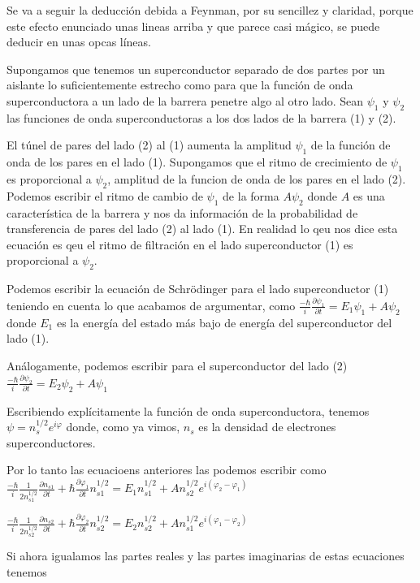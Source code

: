 Se va a seguir la deducción debida a Feynman, por su sencillez y claridad, porque este efecto enunciado unas lineas arriba y que parece casi mágico, se puede deducir en unas opcas líneas.

Supongamos que tenemos un superconductor separado de dos partes por un aislante lo suficientemente estrecho como para que la función de onda superconductora a un lado de la barrera penetre algo al otro lado. Sean $\psi_1$ y $\psi_2$ las funciones de onda superconductoras a los dos lados de la barrera (1) y (2).

El túnel de pares del lado (2) al (1) aumenta la amplitud $\psi_1$ de la función de onda de los pares en el lado (1). Supongamos que el ritmo de crecimiento de $\psi_1$ es proporcional a $\psi_2$, amplitud de la funcion de onda de los pares en el lado (2). Podemos escribir el ritmo de cambio de $\psi_1$ de la forma $A \psi_2$ donde $A$ es una característica de la barrera y nos da información de la probabilidad de transferencia de pares del lado (2) al lado (1). En realidad lo qeu nos dice esta ecuación es qeu el ritmo de filtración en el lado superconductor (1) es proporcional a $\psi_2$.

Podemos escribir la ecuación de Schrödinger para el lado superconductor (1) teniendo en cuenta lo que acabamos de argumentar, como $\frac{-\hbar}{i} \frac{\partial \psi_1}{\partial t} = E_1 \psi_1 + A \psi_2$ donde $E_1$ es la energía del estado más bajo de energía del superconductor del lado (1).

Análogamente, podemos escribir para el superconductor del lado (2) $\frac{-\hbar}{i} \frac{\partial \psi_2}{\partial t} = E_2 \psi_2 + A \psi_1$

Escribiendo explícitamente la función de onda superconductora, tenemos $\psi = n_s^{1/2} e^{i \varphi}$ donde, como ya vimos, $n_s$ es la densidad de electrones superconductores.

Por lo tanto las ecuacioens anteriores las podemos escribir como $\frac{-\hbar}{i} \frac{1}{2 n_{s1}^{1/2}} \frac{\partial n_{s1}}{\partial t} + \hbar \frac{\partial \varphi_1}{\partial t} n_{s1}^{1/2} = E_1 n_{s1}^{1/2} + A n_{s2}^{1/2} e^{i (\varphi_2 - \varphi_1)}$

$\frac{-\hbar}{i} \frac{1}{2 n_{s2}^{1/2}} \frac{\partial n_{s2}}{\partial t} + \hbar \frac{\partial \varphi_2}{\partial t} n_{s2}^{1/2} = E_2 n_{s2}^{1/2} + A n_{s1}^{1/2} e^{i (\varphi_1 - \varphi_2)}$

Si ahora igualamos las partes reales y las partes imaginarias de estas ecuaciones tenemos

